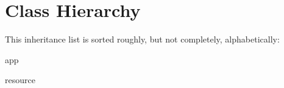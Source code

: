 \section{Class Hierarchy}
This inheritance list is sorted roughly, but not completely, alphabetically\+:\begin{DoxyCompactList}
\item app\begin{DoxyCompactList}
\item {}
\end{DoxyCompactList}
\item resource\begin{DoxyCompactList}
\item {}
\item {}
\item {}
\end{DoxyCompactList}
\end{DoxyCompactList}
